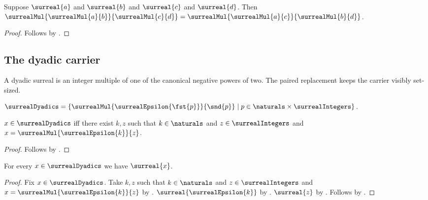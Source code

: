 \begin{lemma}\label{surreal_mul_four_rearrange}
    Suppose $\surreal{a}$ and $\surreal{b}$ and
        $\surreal{c}$ and $\surreal{d}$.
    Then
        $\surrealMul{\surrealMul{a}{b}}{\surrealMul{c}{d}}
        =\surrealMul{\surrealMul{a}{c}}{\surrealMul{b}{d}}$.
\end{lemma}
\begin{proof}
    Follows by
        .
\end{proof}

\subsection{The dyadic carrier}

A dyadic surreal is an integer multiple of one of the canonical negative
powers of two.  The paired replacement keeps the carrier visibly set-sized.

\begin{definition}\label{surreal_dyadics}
    $\surrealDyadics=
        \{\surrealMul{\surrealEpsilon{\fst{p}}}{\snd{p}}
            \mid p\in\naturals\times\surrealIntegers\}$.
\end{definition}

\begin{proposition}\label{surreal_dyadic_iff}
    $x\in\surrealDyadics$ iff there exist $k,z$ such that
        $k\in\naturals$ and $z\in\surrealIntegers$ and
        $x=\surrealMul{\surrealEpsilon{k}}{z}$.
\end{proposition}
\begin{proof}
    Follows by
        .
\end{proof}

\begin{proposition}\label{surreal_dyadic_is_surreal}
    For every $x\in\surrealDyadics$ we have $\surreal{x}$.
\end{proposition}
\begin{proof}
    Fix $x\in\surrealDyadics$.
    Take $k,z$ such that $k\in\naturals$ and
        $z\in\surrealIntegers$ and
        $x=\surrealMul{\surrealEpsilon{k}}{z}$
        by .
    $\surreal{\surrealEpsilon{k}}$
        by .
    $\surreal{z}$ by .
    Follows by .
\end{proof}

